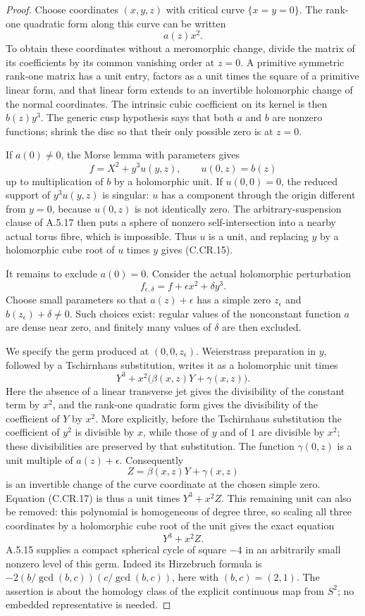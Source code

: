 \begin{proof}
Choose coordinates $(x,y,z)$ with critical curve
$\{x=y=0\}$. The rank-one quadratic form along this curve
can be written
\[
 a(z)x^2.
\]
To obtain these coordinates without a meromorphic change,
divide the matrix of its coefficients by its common
vanishing order at $z=0$. A primitive symmetric rank-one
matrix has a unit entry, factors as a unit times the
square of a primitive linear form, and that linear form
extends to an invertible holomorphic change of the normal
coordinates. The intrinsic cubic coefficient on its
kernel is then $b(z)y^3$. The generic cusp hypothesis says
that both $a$ and $b$ are nonzero functions; shrink the
disc so that their only possible zero is at $z=0$.

If $a(0)\ne0$, the Morse lemma with parameters gives
\[
 f=X^2+y^3u(y,z),\qquad u(0,z)=b(z)
\]
up to multiplication of $b$ by a holomorphic unit.
If $u(0,0)=0$, the reduced support of $y^3u(y,z)$ is
singular: $u$ has a component through the origin
different from $y=0$, because $u(0,z)$ is not identically
zero. The arbitrary-suspension clause of A.5.17 then
puts a sphere of nonzero self-intersection into a
nearby actual torus fibre, which is impossible.
Thus $u$ is a unit, and replacing $y$ by a holomorphic
cube root of $u$ times $y$ gives (C.CR.15).

It remains to exclude $a(0)=0$. Consider the actual
holomorphic perturbation
\[
                  f_{\epsilon,\delta}
                      =f+\epsilon x^2+\delta y^3.
 \tag{C.CR.16}
\]
Choose small parameters so that $a(z)+\epsilon$ has a
simple zero $z_\epsilon$ and
$b(z_\epsilon)+\delta\ne0$. Such choices exist:
regular values of the nonconstant function $a$ are
dense near zero, and finitely many values of $\delta$
are then excluded.

We specify the germ produced at
$(0,0,z_\epsilon)$. Weierstrass preparation in $y$,
followed by a Tschirnhaus substitution, writes it as
a holomorphic unit times
\[
             Y^3+x^2\bigl(\beta(x,z)Y+\gamma(x,z)\bigr).
 \tag{C.CR.17}
\]
Here the absence of a linear transverse jet gives
the divisibility of the constant term by $x^2$,
and the rank-one quadratic form gives the divisibility
of the coefficient of $Y$ by $x^2$. More explicitly,
before the Tschirnhaus substitution the coefficient
of $y^2$ is divisible by $x$, while those of $y$
and of $1$ are divisible by $x^2$; these divisibilities
are preserved by that substitution.
The function $\gamma(0,z)$ is a unit multiple of
$a(z)+\epsilon$. Consequently
\[
             Z=\beta(x,z)Y+\gamma(x,z)
\]
is an invertible change of the curve coordinate at
the chosen simple zero. Equation (C.CR.17) is thus
a unit times $Y^3+x^2Z$. This remaining unit can
also be removed: this polynomial is homogeneous
of degree three, so scaling all three coordinates
by a holomorphic cube root of the unit gives the
exact equation
\[
                            Y^3+x^2Z.
 \tag{C.CR.18}
\]
A.5.15 supplies a compact spherical cycle of square $-4$
in an arbitrarily small nonzero level of this germ.
Indeed its Hirzebruch formula is
$-2(b/\gcd(b,c))(c/\gcd(b,c))$, here with
$(b,c)=(2,1)$. The assertion is about the homology
class of the explicit continuous map from $S^2$;
no embedded representative is needed.


\end{proof}
